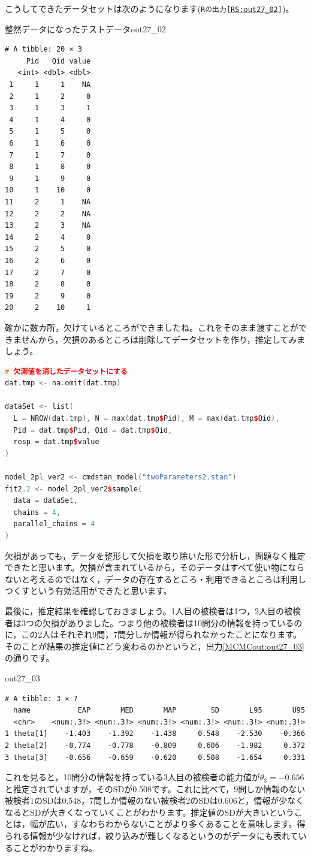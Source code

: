 \documentclass{ltjsbook}
\begin{document}
こうしてできたデータセットは次のようになります(\texttt{Rの出力\ref{RS:out27_02}})。
\begin{Rscreen}{整然データになったテストデータ}{out27_02}
	\begin{verbatim}
# A tibble: 20 × 3
     Pid   Qid value
   <int> <dbl> <dbl>
 1     1     1    NA
 2     1     2     0
 3     1     3     1
 4     1     4     0
 5     1     5     0
 6     1     6     0
 7     1     7     0
 8     1     8     0
 9     1     9     0
10     1    10     0
11     2     1    NA
12     2     2    NA
13     2     3    NA
14     2     4     0
15     2     5     0
16     2     6     0
17     2     7     0
18     2     8     0
19     2     9     0
20     2    10     1
    \end{verbatim}
\end{Rscreen}
確かに数カ所，欠けているところができましたね。これをそのまま渡すことができませんから，欠損のあるところは削除してデータセットを作り，推定してみましょう。
\begin{lstlisting}[language=c++,label={code:27_03},caption={データセットを作って推定する}]
# 欠測値を消したデータセットにする
dat.tmp <- na.omit(dat.tmp)

dataSet <- list(
  L = NROW(dat.tmp), N = max(dat.tmp$Pid), M = max(dat.tmp$Qid),
  Pid = dat.tmp$Pid, Qid = dat.tmp$Qid,
  resp = dat.tmp$value
)

model_2pl_ver2 <- cmdstan_model("twoParameters2.stan")
fit2.2 <- model_2pl_ver2$sample(
  data = dataSet,
  chains = 4,
  parallel_chains = 4
)
\end{lstlisting}
欠損があっても，データを整形して欠損を取り除いた形で分析し，問題なく推定できたと思います。欠損が含まれているから，そのデータはすべて使い物にならないと考えるのではなく，データの存在するところ・利用できるところは利用しつくすという有効活用ができたと思います。

最後に，推定結果を確認しておきましょう。1人目の被検者は1つ，2人目の被検者は3つの欠損がありました。つまり他の被検者は10問分の情報を持っているのに，この2人はそれぞれ9問，7問分しか情報が得られなかったことになります。
そのことが結果の推定値にどう変わるのかというと，出力\ref{MCMCout:out27_03}の通りです。
\begin{MCMCout}{}{out27_03}
	\begin{verbatim}
# A tibble: 3 × 7
  name           EAP       MED       MAP        SD       L95       U95
  <chr>    <num:.3!> <num:.3!> <num:.3!> <num:.3!> <num:.3!> <num:.3!>
1 theta[1]    -1.403    -1.392    -1.438     0.548    -2.530    -0.366
2 theta[2]    -0.774    -0.778    -0.809     0.606    -1.982     0.372
3 theta[3]    -0.656    -0.659    -0.620     0.508    -1.654     0.331
\end{verbatim}
\end{MCMCout}
これを見ると，10問分の情報を持っている3人目の被検者の能力値が$\theta_3 = -0.656$と推定されていますが，そのSDが0.508です。これに比べて，9問しか情報のない被検者1のSDは0.548，7問しか情報のない被検者2のSDは0.606と，情報が少なくなるとSDが大きくなっていくことがわかります。推定値のSDが大きいということは，幅が広い，すなわちわからないことがより多くあることを意味します。得られる情報が少なければ，絞り込みが難しくなるというのがデータにも表れていることがわかりますね。
\end{document}
